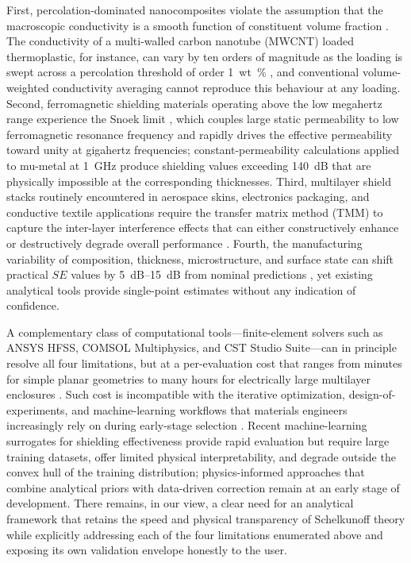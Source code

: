 \documentclass[review,3p,authoryear]{elsarticle}
\begin{document}
First, percolation-dominated nanocomposites violate the assumption that the macroscopic conductivity is a smooth function of constituent volume fraction \citep{Kirkpatrick1973, Stauffer1994}. The conductivity of a multi-walled carbon nanotube (MWCNT) loaded thermoplastic, for instance, can vary by ten orders of magnitude as the loading is swept across a percolation threshold of order \SI{1}{wt\%} \citep{AlSaleh2009, Arjmand2011}, and conventional volume-weighted conductivity averaging cannot reproduce this behaviour at any loading. Second, ferromagnetic shielding materials operating above the low megahertz range experience the Snoek limit \citep{Snoek1948}, which couples large static permeability to low ferromagnetic resonance frequency and rapidly drives the effective permeability toward unity at gigahertz frequencies; constant-permeability calculations applied to mu-metal at \SI{1}{GHz} produce shielding values exceeding \SI{140}{dB} that are physically impossible at the corresponding thicknesses. Third, multilayer shield stacks routinely encountered in aerospace skins, electronics packaging, and conductive textile applications require the transfer matrix method (TMM) to capture the inter-layer interference effects that can either constructively enhance or destructively degrade overall performance \citep{Yeh1988, Celozzi2008, Kim2008}. Fourth, the manufacturing variability of composition, thickness, microstructure, and surface state can shift practical $SE$ values by \SIrange{5}{15}{dB} from nominal predictions \citep{Paul2006}, yet existing analytical tools provide single-point estimates without any indication of confidence.

A complementary class of computational tools---finite-element solvers such as ANSYS HFSS, COMSOL Multiphysics, and CST Studio Suite---can in principle resolve all four limitations, but at a per-evaluation cost that ranges from minutes for simple planar geometries to many hours for electrically large multilayer enclosures \citep{Pozar2011}. Such cost is incompatible with the iterative optimization, design-of-experiments, and machine-learning workflows that materials engineers increasingly rely on during early-stage selection \citep{Cao2020, Han2020}. Recent machine-learning surrogates for shielding effectiveness \citep{Cao2020} provide rapid evaluation but require large training datasets, offer limited physical interpretability, and degrade outside the convex hull of the training distribution; physics-informed approaches that combine analytical priors with data-driven correction remain at an early stage of development. There remains, in our view, a clear need for an analytical framework that retains the speed and physical transparency of Schelkunoff theory while explicitly addressing each of the four limitations enumerated above and exposing its own validation envelope honestly to the user.
\end{document}
